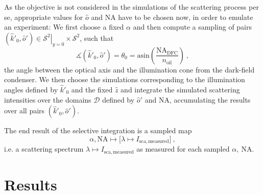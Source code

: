 \documentclass[10pt]{article}
\begin{document}

As the objective is not considered in the simulations of the scattering process per se, appropriate values for $\hat{o}$ and $\mathrm{NA}$ have to be chosen now, in order to emulate an experiment: 
We first choose a fixed $\alpha$ and then compute a sampling of pairs $\left( \hat{k}'_0 , \hat{o}' \right) \in \left. \mathcal{S}^2 \right\vert_{y=0} \times \mathcal{S}^2$, such that 
$$
    \measuredangle\!\left(\hat{k}'_0 , \hat{o}'\right) = \theta_0 = \mathrm{asin}\!\left( \frac{\mathrm{NA}_\mathrm{DFC}}{n_\mathrm{oil}} \right) \ , 
$$
the angle between the optical axis and the illumination cone from the dark-field condenser. 
We then choose the simulations corresponding to the illumination angles defined by $\hat{k}'_0$ and the fixed $\hat{z}$ and integrate the simulated scattering intensities over the domains $\mathcal{D}$ defined by $\hat{o}'$ and $\mathrm{NA}$, accumulating the results over all pairs $\left( \hat{k}'_0 , \hat{o}' \right)$.

The end result of the selective integration is a sampled map 
$$
    \alpha,\mathrm{NA} \mapsto \bigl[ \lambda \mapsto I_\mathrm{sca,measured} \bigr] \ ,
$$
i.e. a scattering spectrum $\lambda \mapsto I_\mathrm{sca,measured}$ as measured for each sampled $\alpha,\ \mathrm{NA}$. 










\section*{Results}
\end{document}
